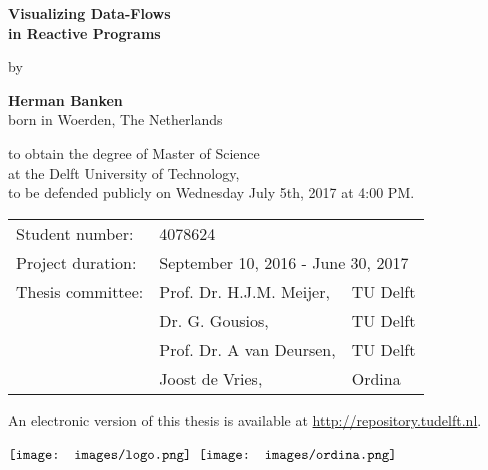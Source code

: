 \begin{minipage}[t][0.99\textheight]{0.99\textwidth}
    \begin{center}
        \vspace*{1cm}
        
        \Huge
        \textbf{Visualizing Data-Flows \\in Reactive Programs}
        
        \large
		\vspace{0.5cm}
		by
        \vspace{0.5cm}
        
        \Large
        \textbf{Herman Banken}\\
		\normalsize
        born in Woerden, The Netherlands
        
        \vspace{1cm}
        \vfill

		to obtain the degree of Master of Science\\
		at the Delft University of Technology,\\
		to be defended publicly on Wednesday July 5th, 2017 at 4:00 PM.
        
        \vspace{0.8cm}
                
		\begin{tabular}{l l l}
		Student number:     & \multicolumn{2}{l}{4078624} \\
		Project duration:   & \multicolumn{2}{l}{September 10, 2016 - June 30, 2017} \\
		Thesis committee:   & Prof. Dr. H.J.M. Meijer, 	& TU Delft \\
    						& Dr. G. Gousios,           & TU Delft \\
    						& Prof. Dr. A van Deursen,  & TU Delft \\
    						& Joost de Vries,           & Ordina
		\end{tabular}

        \vspace{0.8cm}

		An electronic version of this thesis is available at \url{http://repository.tudelft.nl}.

\begin{minipage}{6in}
  \centering
  $\vcenter{\hbox{\texttt{[image: images/logo.png]}}}$
  \hspace*{.2in}
  $\vcenter{\hbox{\texttt{[image: images/ordina.png]}}}$
\end{minipage}
        
    \end{center}
\end{minipage}